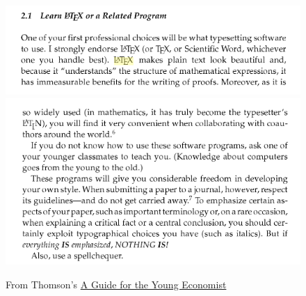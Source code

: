 \documentclass[
11pt, %
]{beamer}
\begin{document}
	\begin{frame}
		\begin{figure}
			\centering
			\includegraphics[scale=0.4]{thomson.png}
			\includegraphics[scale=0.4]{thomson_copy.png}
			\caption{From Thomson's \href{https://www.amazon.co.jp/s?k=9780262201339}{A Guide for the Young Economist}}
		\end{figure}
	\end{frame}
	
\end{document}
